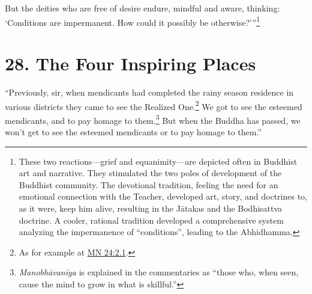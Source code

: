 \documentclass[12pt,openany]{book}%
\begin{document}
But the deities who are free of desire endure, mindful and aware, thinking: ‘Conditions are impermanent. How could it possibly be otherwise?’”\footnote{These two reactions—grief and equanimity—are depicted often in Buddhist art and narrative. They stimulated the two poles of development of the Buddhist community. The devotional tradition, feeling the need for an emotional connection with the Teacher, developed art, story, and doctrines to, as it were, keep him alive, resulting in the \textsanskrit{Jātakas} and the Bodhisattva doctrine. A cooler, rational tradition developed a comprehensive system analyzing the impermanence of “conditions”, leading to the Abhidhamma. } 

\section*{28. The Four Inspiring Places }

“Previously, sir, when mendicants had completed the rainy season residence in various districts they came to see the Realized One.\footnote{As for example at \href{https://suttacentral.net/mn24/en/sujato\#2.1}{MN 24:2.1}. } We got to see the esteemed mendicants, and to pay homage to them.\footnote{\textit{\textsanskrit{Manobhāvanīya}} is explained in the commentaries as “those who, when seen, cause the mind to grow in what is skillful.” } But when the Buddha has passed, we won’t get to see the esteemed mendicants or to pay homage to them.” 
\end{document}

